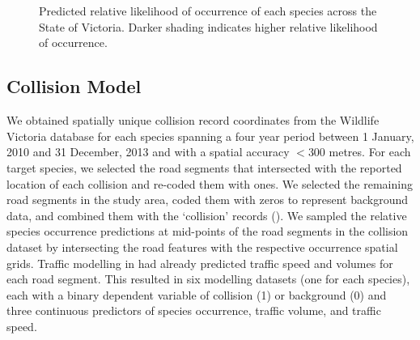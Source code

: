 \begin{figure*}[!t]
  \centering
  \\
  \\  
  \caption[Predicted relative likelihood of six mammal species occurrence in Victoria]{Predicted relative likelihood of occurrence of each species across the State of Victoria. Darker shading indicates higher relative likelihood of occurrence.}
  \label{6sp_occ_preds}
\end{figure*}

\subsection{Collision Model}

We obtained spatially unique collision record coordinates from the Wildlife Victoria database for each species spanning a four year period between 1 January, 2010 and 31 December, 2013 and with a spatial accuracy $<$300 metres. For each target species, we selected the road segments that intersected with the reported location of each collision and re-coded them with ones.  We selected the remaining road segments in the study area, coded them with zeros to represent background data, and combined them with the `collision' records ().  We sampled the relative species occurrence predictions at mid-points of the road segments in the collision dataset by intersecting the road features with the respective occurrence spatial grids.  Traffic modelling in  had already predicted traffic speed and volumes for each road segment.  This resulted in six modelling datasets (one for each species), each with a binary dependent variable of collision (1) or background (0) and three continuous predictors of species occurrence, traffic volume, and traffic speed.

